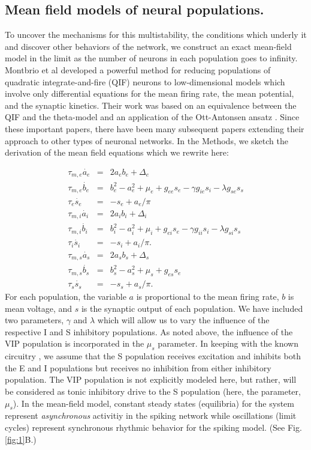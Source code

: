 \documentclass[10pt,letterpaper]{article}
\begin{document}
\subsection*{Mean field models of neural populations.}
To uncover the mechanisms for this multistability, the conditions which underly it and discover other behaviors of the network, we construct an exact mean-field model in the limit as the number of neurons in each population goes to infinity.  
Montbrio et al \cite{montbrio} developed a powerful method for reducing populations of quadratic integrate-and-fire (QIF) neurons to low-dimensional models which involve only differential equations for the mean firing rate, the mean potential, and the synaptic kinetics.  Their work was based on an equivalence between the QIF and the theta-model \cite{ke86} and an application of the Ott-Antonsen ansatz \cite{oa}.  Since these important papers, there have been many subsequent papers extending their approach to other types of neuronal networks.  In the Methods, we sketch the derivation of the mean field equations which we rewrite here:

\begin{eqnarray}
    \tau_{m,e} \dot{a_e} &=& 2 a_eb_e + \Delta_e \nonumber \\
    \tau_{m,e} \dot{b_e} &=& b_e^2-a_e^2 + \mu_e + g_{ee}s_e - \gamma g_{ie}s_i-\lambda g_{se}s_s \nonumber \\
    \tau_{e} \dot{s_e} &=& -s_e+a_e/\pi \nonumber \\
    \tau_{m,i} \dot{a_i} &=& 2 a_ib_i + \Delta_i \nonumber \\
    \tau_{m,i} \dot{b_i} &=& b_i^2-a_i^2 + \mu_i + g_{ei}s_e - \gamma g_{ii}s_i-\lambda g_{si}s_s  \\
    \label{eq:eisoa}
    \tau_{i} \dot{s_i} &=& -s_i+a_i/\pi. \nonumber \\
    \tau_{m,s} \dot{a_s} &=& 2 a_sb_s + \Delta_s \nonumber \\
    \tau_{m,s} \dot{b_s} &=& b_s^2-a_s^2 + \mu_s + g_{es}s_e  \nonumber \\
    \tau_{s} \dot{s_s} &=& -s_s+a_s/\pi. \nonumber
\end{eqnarray}
For each population, the variable $a$ is proportional to the mean firing rate, $b$ is mean voltage, and $s$ is the synaptic output of each population.   
We have included two parameters, $\gamma$ and $\lambda$ which will allow us to vary the influence of the respective I and S inhibitory populations.  As noted above, the influence of the VIP population is incorporated in the $\mu_s$ parameter.  In keeping with the known circuitry \cite{veit23}, we assume that the S population receives excitation and inhibits both the E and I populations but receives no inhibition from either inhibitory population. The VIP population is not explicitly modeled here, but rather, will be considered as tonic inhibitory drive to the S population (here, the parameter, $\mu_s$).  In the mean-field model, constant steady states (equilibria) for the system represent {\em asynchronous} activitiy in the spiking network while oscillations (limit cycles) represent synchronous rhythmic behavior for the spiking model. (See Fig. \ref{fig:1}B.)
\end{document}

